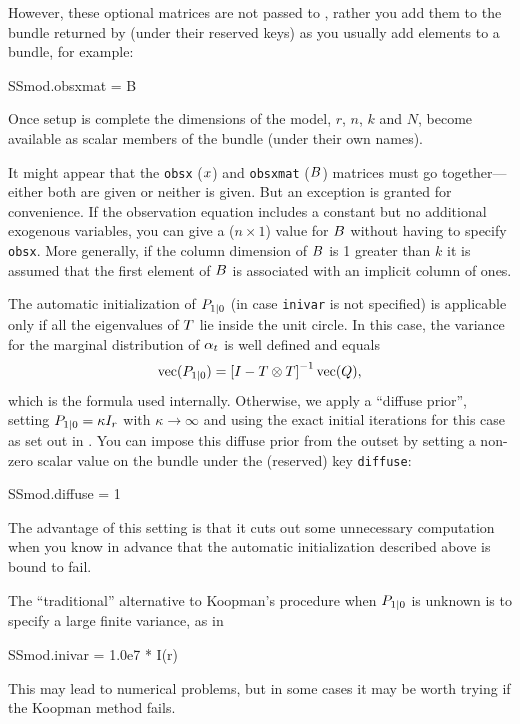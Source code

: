 However, these optional matrices are not passed to ,
rather you add them to the bundle returned by  (under
their reserved keys) as you usually add elements to a bundle, for
example:
\begin{code}
SSmod.obsxmat = B
\end{code}

Once setup is complete the dimensions of the model, $r$, $n$, $k$ and
$N$, become available as scalar members of the bundle (under their own
names).

It might appear that the \texttt{obsx} ($x$) and \texttt{obsxmat}
($B$) matrices must go together---either both are given or
neither is given.  But an exception is granted for convenience.  If
the observation equation includes a constant but no additional
exogenous variables, you can give a ($n \times 1$) value for
$B$ without having to specify \texttt{obsx}.  More generally,
if the column dimension of $B$ is 1 greater than $k$ it is
assumed that the first element of $B$ is associated with an
implicit column of ones.

The automatic initialization of $P_{1|0}$ (in case
\texttt{inivar} is not specified) is applicable only if all the
eigenvalues of $T$ lie inside the unit circle. In this case,
the variance for the marginal distribution of $\alpha_t$ is well
defined and equals
\[
\mbox{vec}(P_{1|0}) = \left[ I - T \otimes T
\right]^{-1} \mbox{vec}(Q) ,
\]
which is the formula used internally. Otherwise, we apply a ``diffuse
prior'', setting $P_{1|0} = \kappa I_r$ with
$\kappa \rightarrow \infty$ and using the exact initial iterations for
this case as set out in \cite{koopman97}. You can impose this diffuse
prior from the outset by setting a non-zero scalar value on the bundle
under the (reserved) key \texttt{diffuse}:
%
\begin{code}
SSmod.diffuse = 1
\end{code}
The advantage of this setting is that it cuts out some unnecessary
computation when you know in advance that the automatic initialization
described above is bound to fail.

The ``traditional'' alternative to Koopman's procedure when
$P_{1|0}$ is unknown is to specify a large finite variance,
as in
%
\begin{code}
SSmod.inivar = 1.0e7 * I(r)
\end{code}
%
This may lead to numerical problems, but in some cases it may be worth
trying if the Koopman method fails.


